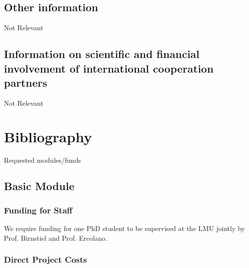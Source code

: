 \documentclass[10pt,fleqn,twoside]{article}
\newcommand{\Tcol}{\color{blue}}
\begin{document}
\subsection{\Tcol Other information}

Not Relevant

\subsection{\Tcol Information on scientific and financial involvement of international cooperation partners}

Not Relevant

\section{\Tcol Bibliography}

\begingroup
\renewcommand{\section}[2]{}%


\endgroup

\section{\Tcol Requested modules/funds}
\renewcommand{\leftmark}{\sc  Requested modules/funds}

\subsection{\Tcol Basic Module}

\subsubsection{\Tcol Funding for Staff}

We require funding for one PhD student to be supervised at the LMU
jointly by Prof. Birnstiel and Prof. Ercolano.

\subsubsection{\Tcol Direct Project Costs}
\end{document}

